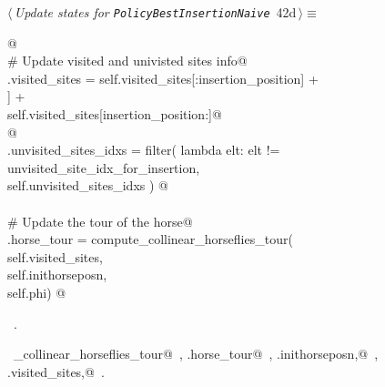 \documentclass[11.5pt]{report}
\begin{document}
\vspace{-0.8cm}\newchunk 
\begin{flushleft} \small\label{scrap51}\raggedright\small
{} $\langle\,${\itshape Update states for \texttt{PolicyBestInsertionNaive}}\nobreak\ {\footnotesize {42d}}$\,\rangle\equiv$
\vspace{-1ex}
\begin{list}{}{} \item
\mbox{}\verb@   @\\
\mbox{}\verb@# Update visited and univisted sites info@\\
\mbox{}\verb@self.visited_sites = self.visited_sites[:insertion_position]      +\@\\
\mbox{}\verb@                     [self.sites[unvisited_site_idx_for_insertion]] +\@\\
\mbox{}\verb@                     self.visited_sites[insertion_position:]@\\
\mbox{}\verb@  @\\
\mbox{}\verb@self.unvisited_sites_idxs = filter( lambda elt: elt != unvisited_site_idx_for_insertion, \@\\
\mbox{}\verb@                                    self.unvisited_sites_idxs ) @\\
\mbox{}\verb@@\\
\mbox{}\verb@# Update the tour of the horse@\\
\mbox{}\verb@self.horse_tour = compute_collinear_horseflies_tour(\@\\
\mbox{}\verb@                           self.visited_sites,         \@\\
\mbox{}\verb@                           self.inithorseposn, \@\\
\mbox{}\verb@                           self.phi) @\\
\mbox{}\verb@@{\NWsep}
\end{list}
\vspace{-1.5ex}
\footnotesize
\begin{list}{}{\setlength{\itemsep}{-\parsep}\setlength{\itemindent}{-\leftmargin}}
\item \NWtxtMacroRefIn\ .
\item \NWtxtIdentsUsed\nobreak\  \verb@compute_collinear_horseflies_tour@\nobreak\ , \verb@self.horse_tour@\nobreak\ , \verb@self.inithorseposn,@\nobreak\ , \verb@self.visited_sites,@\nobreak\ .
\item{}
\end{list}
\vspace{4ex}
\end{flushleft}
\end{document}

